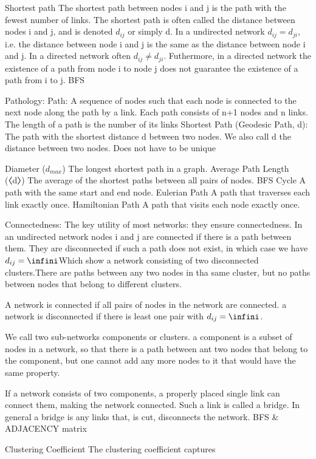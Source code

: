 Shortest path  
    The shortest path between nodes i and j is the path with the fewest number of links. The shortest path is often called the distance between nodes i and j, and is denoted $d_{ij}$ or simply d. 
    In a undirected network $d_{ij}=d_{ji}$, i.e. the distance between node i and j is the same as the distance between node i and j. In a directed network often $d_{ij} \neq d_{ji}$. Futhermore, in a directed network the existence of a path from node i to node j does not guarantee the existence of a path from i to j. BFS

Pathology: 
    Path: 
        A sequence of nodes such that each node is connected to the next node along the path by a link. Each path consists of n+1 nodes and n links. The length of a path is the number of its links
    Shortest Path (Geodesic Path, d):  
        The path with the shortest distance d between two nodes. We also call d the distance between two nodes. Does not have to be unique 
    
    Diameter ($d_{max}$)
        The longest shortest path in a graph.
    Average Path Length (〈d〉)
        The average of the shortest paths between all pairs of nodes. BFS 
    Cycle
        A path with the same start and end node. 
    Eulerian Path
        A path that traverses each link exactly once. 
    Hamiltonian Path
        A path that visits each node exactly once. 
        

Connectedness: 
    The key utility of most networks: they ensure connectedness. 
    In an undirected network nodes i and j are connected if there is a path between them. They are disconnected if such a path does not exist, in which case we have $d_{ij}=\infini $Which show a network consisting of two disconnected clusters.There are paths between any two nodes in tha same cluster, but no paths between nodes that belong to different clusters. 
    
    A network is connected if all pairs of nodes in the network are connected. a network is disconnected if there is least one pair with $d_{ij}= \infini $. 
    
    We call two sub-networks components or clusters. a component is a subset of nodes in a network, so that there is a path between ant two nodes that belong to the component, but one cannot add any more nodes to it that would have the same property. 
    
    If a network consists of two components, a properly placed single link can connect them, making the network connected. Such a link is called a bridge. In general a bridge is any links that, is cut, disconnects the network. BFS & ADJACENCY matrix 
    
Clustering Coefficient 
The clustering coefficient captures